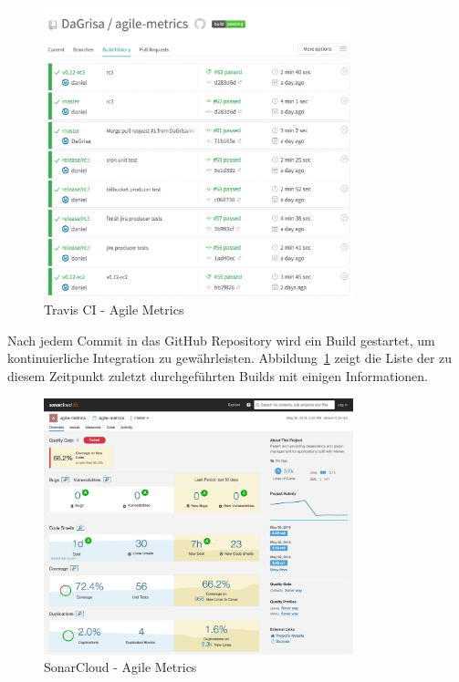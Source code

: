 \begin{savenotes}
    \begin{figure}[H] 
        \centering
            \includegraphics[width=0.8\textwidth]{img/travisci.png}
        \caption{Travis CI - Agile Metrics}\label{fig:travisci}
    \end{figure}
\end{savenotes}

Nach jedem Commit in das GitHub Repository wird ein Build gestartet, um kontinuierliche Integration zu gewährleisten.
Abbildung~\ref{fig:travisci} zeigt die Liste der zu diesem Zeitpunkt zuletzt durchgeführten Builds mit einigen Informationen.

\begin{savenotes}
    \begin{figure}[H] 
        \centering
            \includegraphics[width=0.8\textwidth]{img/sonarcloud.png}
        \caption{SonarCloud - Agile Metrics}\label{fig:sonarcloud}
    \end{figure}
\end{savenotes}

